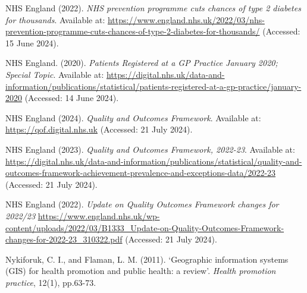 \begin{Reference}
\begin{flushleft}
NHS England (2022). \textit{NHS prevention programme cuts chances of type 2 diabetes for thousands}. Available at: \url{https://www.england.nhs.uk/2022/03/nhs-prevention-programme-cuts-chances-of-type-2-diabetes-for-thousands/} (Accessed: 15 June 2024).
\end{flushleft}
\vspace{2pt}


\begin{flushleft}
NHS England. (2020). \textit{Patients Registered at a GP Practice January 2020; Special Topic}. Available at: \url{https://digital.nhs.uk/data-and-information/publications/statistical/patients-registered-at-a-gp-practice/january-2020} (Accessed: 14 June 2024).
\end{flushleft}
\vspace{7pt}


\begin{flushleft}
NHS England (2024). \textit{Quality and Outcomes Framework}. Available at: \url{https://qof.digital.nhs.uk} (Accessed: 21 July 2024).
\end{flushleft}
\vspace{7pt}


\begin{flushleft}
NHS England (2023). \textit{Quality and Outcomes Framework, 2022-23}. Available at: \url{https://digital.nhs.uk/data-and-information/publications/statistical/quality-and-outcomes-framework-achievement-prevalence-and-exceptions-data/2022-23} (Accessed: 21 July 2024).
\end{flushleft}
\vspace{7pt}


\begin{flushleft}
NHS England (2022). \textit{Update on Quality Outcomes Framework changes for 2022/23}
\url{https://www.england.nhs.uk/wp-content/uploads/2022/03/B1333_Update-on-Quality-Outcomes-Framework-changes-for-2022-23_310322.pdf} (Accessed: 21 July 2024).
\end{flushleft}
\vspace{7pt}


\begin{flushleft}
Nykiforuk, C. I., and Flaman, L. M. (2011). `Geographic information systems (GIS) for health promotion and public health: a review'. \textit{Health promotion practice}, 12(1), pp.63-73.
\end{flushleft}
\vspace{2pt}



\end{Reference}
